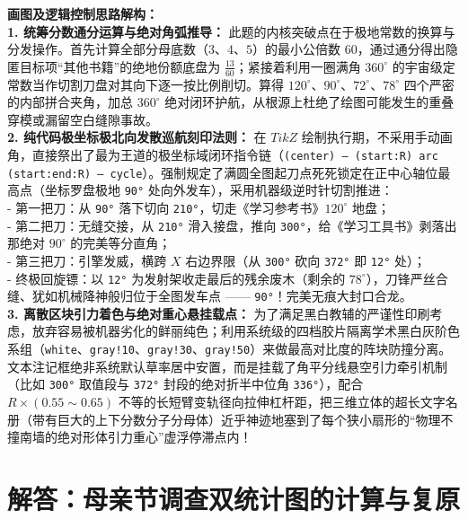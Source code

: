\documentclass[12pt, a4paper]{ctexrep}
\begin{document}
\vspace{0.4cm}
{\small\color{blue!70!black}
\textbf{画图及逻辑控制思路解构：}\\
\textbf{1. 统筹分数通分运算与绝对角弧推导：} 此题的内核突破点在于极地常数的换算与分发操作。首先计算全部分母底数（$3、4、5$）的最小公倍数 60，通过通分得出隐匿目标项“其他书籍”的绝地份额底盘为 $\frac{13}{60}$；紧接着利用一圈满角 $360^\circ$ 的宇宙级定常数当作切割刀盘对其向下逐一按比例削切。算得 $120^\circ、90^\circ、72^\circ、78^\circ$ 四个严密的内部拼合夹角，加总 $360^\circ$ 绝对闭环护航，从根源上杜绝了绘图可能发生的重叠穿模或漏留空白缝隙事故。\\
\textbf{2. 纯代码极坐标极北向发散巡航刻印法则：} 在 $TikZ$ 绘制执行期，不采用手动画角，直接祭出了最为王道的极坐标域闭环指令链（\texttt{(center) -- (start:R) arc (start:end:R) -- cycle}）。强制规定了满圆全图起刀点死死锁定在正中心轴位最高点（坐标罗盘极地 \texttt{90°} 处向外发车），采用机器级逆时针切割推进：\\
- 第一把刀：从 \texttt{90°} 落下切向 \texttt{210°}，切走《学习参考书》$120^\circ$ 地盘；\\
- 第二把刀：无缝交接，从 \texttt{210°} 滑入接盘，推向 \texttt{300°}，给《学习工具书》剥落出那绝对 $90^\circ$ 的完美等分直角；\\
- 第三把刀：引擎发威，横跨 $X$ 右边界限（从 \texttt{300°} 砍向 \texttt{372°} 即 \texttt{12°} 处）；\\
- 终极回旋镖：以 \texttt{12°} 为发射架收走最后的残余废木（剩余的 $78^\circ$），刀锋严丝合缝、犹如机械降神般归位于全图发车点 —— \texttt{90°}！完美无痕大封口合龙。\\
\textbf{3. 离散区块引力着色与绝对重心悬挂载点：} 为了满足黑白教辅的严谨性印刷考虑，放弃容易被机器劣化的鲜丽纯色；利用系统级的四档胶片隔离学术黑白灰阶色系组（\texttt{white}、\texttt{gray!10}、\texttt{gray!30}、\texttt{gray!50}）来做最高对比度的阵块防撞分离。文本注记框绝非系统默认草率居中安置，而是挂载了角平分线悬空引力牵引机制（比如 \texttt{300°} 取值段与 \texttt{372°} 封段的绝对折半中位角 \texttt{336°}），配合 $R \times (0.55\sim 0.65)$ 不等的长短臂变轨径向拉伸杠杆距，把三维立体的超长文字名册（带有巨大的上下分数分子分母体）近乎神迹地塞到了每个狭小扇形的“物理不撞南墙的绝对形体引力重心”虚浮停滞点内！
}

\newpage

\section{解答：母亲节调查双统计图的计算与复原}
\end{document}

